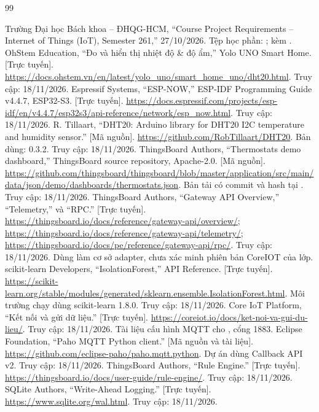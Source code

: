 \begin{thebibliography}{99}
 Trường Đại học Bách khoa -- ĐHQG-HCM, ``Course Project Requirements -- Internet of Things (IoT), Semester 261,'' 27/10/2026. Tệp học phần: ; kèm .
 OhStem Education, ``Đo và hiển thị nhiệt độ \& độ ẩm,'' Yolo UNO Smart Home. [Trực tuyến]. \url{https://docs.ohstem.vn/en/latest/yolo_uno/smart_home_uno/dht20.html}. Truy cập: 18/11/2026.
 Espressif Systems, ``ESP-NOW,'' ESP-IDF Programming Guide v4.4.7, ESP32-S3. [Trực tuyến]. \url{https://docs.espressif.com/projects/esp-idf/en/v4.4.7/esp32s3/api-reference/network/esp_now.html}. Truy cập: 18/11/2026.
 R. Tillaart, ``DHT20: Arduino library for DHT20 I2C temperature and humidity sensor.'' [Mã nguồn]. \url{https://github.com/RobTillaart/DHT20}. Bản dùng: 0.3.2. Truy cập: 18/11/2026.
 ThingsBoard Authors, ``Thermostats demo dashboard,'' ThingsBoard source repository, Apache-2.0. [Mã nguồn]. \url{https://github.com/thingsboard/thingsboard/blob/master/application/src/main/data/json/demo/dashboards/thermostats.json}. Bản tải có commit và hash tại . Truy cập: 18/11/2026.
 ThingsBoard Authors, ``Gateway API Overview,'' ``Telemetry,'' và ``RPC.'' [Trực tuyến]. \url{https://thingsboard.io/docs/reference/gateway-api/overview/}; \url{https://thingsboard.io/docs/reference/gateway-api/telemetry/}; \url{https://thingsboard.io/docs/pe/reference/gateway-api/rpc/}. Truy cập: 18/11/2026. Dùng làm cơ sở adapter, chưa xác minh phiên bản CoreIOT của lớp.
 scikit-learn Developers, ``IsolationForest,'' API Reference. [Trực tuyến]. \url{https://scikit-learn.org/stable/modules/generated/sklearn.ensemble.IsolationForest.html}. Môi trường chạy dùng scikit-learn 1.8.0. Truy cập: 18/11/2026.
 Core IoT Platform, ``Kết nối và gửi dữ liệu.'' [Trực tuyến]. \url{https://coreiot.io/docs/ket-noi-va-gui-du-lieu/}. Truy cập: 18/11/2026. Tài liệu cấu hình MQTT cho , cổng 1883.
 Eclipse Foundation, ``Paho MQTT Python client.'' [Mã nguồn và tài liệu]. \url{https://github.com/eclipse-paho/paho.mqtt.python}. Dự án dùng Callback API v2. Truy cập: 18/11/2026.
 ThingsBoard Authors, ``Rule Engine.'' [Trực tuyến]. \url{https://thingsboard.io/docs/user-guide/rule-engine/}. Truy cập: 18/11/2026.
 SQLite Authors, ``Write-Ahead Logging.'' [Trực tuyến]. \url{https://www.sqlite.org/wal.html}. Truy cập: 18/11/2026.
\end{thebibliography}
